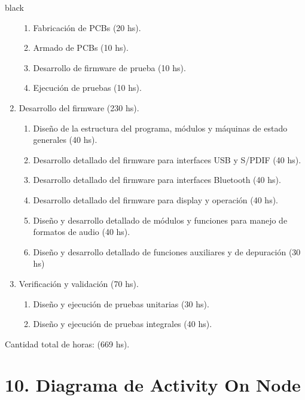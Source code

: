 \documentclass[
11pt, %
]{charter}
\begin{document}
\begin{consigna}{black}
\begin{enumerate}
\begin{enumerate}
	\item Fabricación de PCBs (20 hs).
	\item Armado de PCBs (10 hs).
	\item Desarrollo de firmware de prueba (10 hs).
	\item Ejecución de pruebas (10 hs).
	\end{enumerate}
\item Desarrollo del firmware (230 hs).
	\begin{enumerate}
	\item Diseño de la estructura del programa, módulos y máquinas de estado generales (40 hs).
	\item Desarrollo detallado del firmware para interfaces USB y S/PDIF (40 hs).
	\item Desarrollo detallado del firmware para interfaces Bluetooth (40 hs).
	\item Desarrollo detallado del firmware para display y operación (40 hs).
	\item Diseño y desarrollo detallado de módulos y funciones para manejo de formatos de audio (40 hs).
	\item Diseño y desarrollo detallado de funciones auxiliares y de depuración (30 hs)
	\end{enumerate}
\item Verificación y validación (70 hs).	
	\begin{enumerate}
	\item Diseño y ejecución de pruebas unitarias (30 hs).
	\item Diseño y ejecución de pruebas integrales (40 hs).
	\end{enumerate}	
\end{enumerate}

Cantidad total de horas: (669 hs).

\end{consigna}

\section{10. Diagrama de Activity On Node}
\label{sec:AoN}
\end{document}

